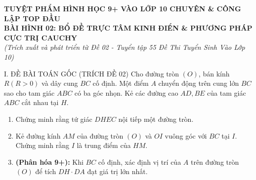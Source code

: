\documentclass[11pt,a4paper]{article}
\begin{document}
\begin{center}
    {\Large\bfseries\color{blue!80!black} TUYỆT PHẨM HÌNH HỌC 9+ VÀO LỚP 10 CHUYÊN \& CÔNG LẬP TOP ĐẦU}\\[2mm]
    {\large\bfseries BÀI HÌNH 02: BỔ ĐỀ TRỰC TÂM KINH ĐIỂN \& PHƯƠNG PHÁP CỰC TRỊ CAUCHY}\\[1mm]
    \textit{(Trích xuất và phát triển từ Đề 02 - Tuyển tập 55 Đề Thi Tuyển Sinh Vào Lớp 10)}
\end{center}

\vspace{1mm}

\begin{modelbox}{I. ĐỀ BÀI TOÁN GỐC (TRÍCH ĐỀ 02)}
Cho đường tròn $(O)$, bán kính $R (R>0)$ và dây cung $BC$ cố định. Một điểm $A$ chuyển động trên cung lớn $BC$ sao cho tam giác $ABC$ có ba góc nhọn. Kẻ các đường cao $AD, BE$ của tam giác $ABC$ cắt nhau tại $H$.
\begin{enumerate}[label=\textbf{\alph*)}]
    \item Chứng minh rằng tứ giác $DHEC$ nội tiếp một đường tròn.
    \item Kẻ đường kính $AM$ của đường tròn $(O)$ và $OI$ vuông góc với $BC$ tại $I$. Chứng minh rằng $I$ là trung điểm của $HM$.
    \item \textbf{(Phân hóa 9+):} Khi $BC$ cố định, xác định vị trí của $A$ trên đường tròn $(O)$ để tích $DH \cdot DA$ đạt giá trị lớn nhất.
\end{enumerate}
\end{modelbox}

\vspace{1mm}
\end{document}
